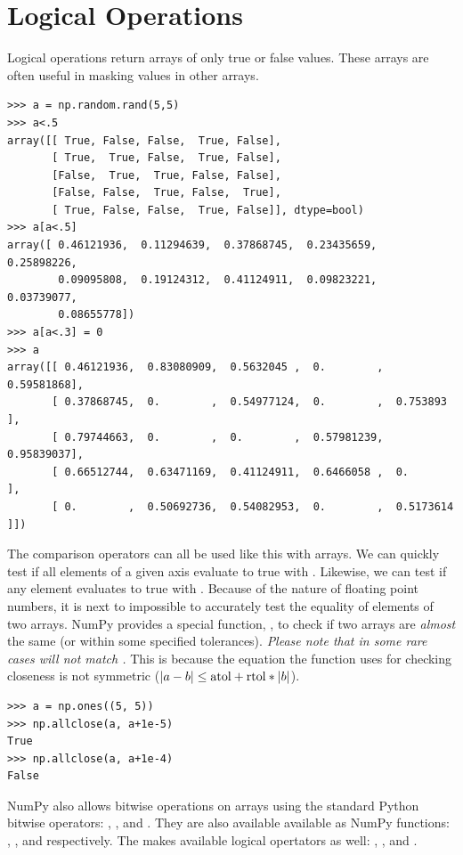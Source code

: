 \section*{Logical Operations}
Logical operations return arrays of only true or false values.
These arrays are often useful in masking values in other arrays.
\begin{lstlisting}
>>> a = np.random.rand(5,5)
>>> a<.5
array([[ True, False, False,  True, False],
       [ True,  True, False,  True, False],
       [False,  True,  True, False, False],
       [False, False,  True, False,  True],
       [ True, False, False,  True, False]], dtype=bool)
>>> a[a<.5]
array([ 0.46121936,  0.11294639,  0.37868745,  0.23435659,  0.25898226,
        0.09095808,  0.19124312,  0.41124911,  0.09823221,  0.03739077,
        0.08655778])
>>> a[a<.3] = 0
>>> a
array([[ 0.46121936,  0.83080909,  0.5632045 ,  0.        ,  0.59581868],
       [ 0.37868745,  0.        ,  0.54977124,  0.        ,  0.753893  ],
       [ 0.79744663,  0.        ,  0.        ,  0.57981239,  0.95839037],
       [ 0.66512744,  0.63471169,  0.41124911,  0.6466058 ,  0.        ],
       [ 0.        ,  0.50692736,  0.54082953,  0.        ,  0.5173614 ]])
\end{lstlisting}
The comparison operators can all be used like this with arrays.
We can quickly test if all elements of a given axis evaluate to true with .  Likewise, we can test if any element evaluates to true with .  
Because of the nature of floating point numbers, it is next to impossible to accurately test the equality of elements of two arrays.
NumPy provides a special function, , to check if two arrays are \emph{almost} the same (or within some specified tolerances).  \emph{Please note that in some rare cases  will not match .}  This is because the equation the function uses for checking closeness is not symmetric ($\left\lvert a-b\right\rvert \leq \mbox{atol} + \mbox{rtol}*\left\lvert b\right\rvert$).      
\begin{lstlisting}
>>> a = np.ones((5, 5))
>>> np.allclose(a, a+1e-5)
True
>>> np.allclose(a, a+1e-4)
False
\end{lstlisting}
NumPy also allows bitwise operations on arrays using the standard Python bitwise operators: \li{&}, \li{|}, and \li{^}.
They are also available available as NumPy functions: , , and  respectively.
The makes available logical opertators as well: , , and .


